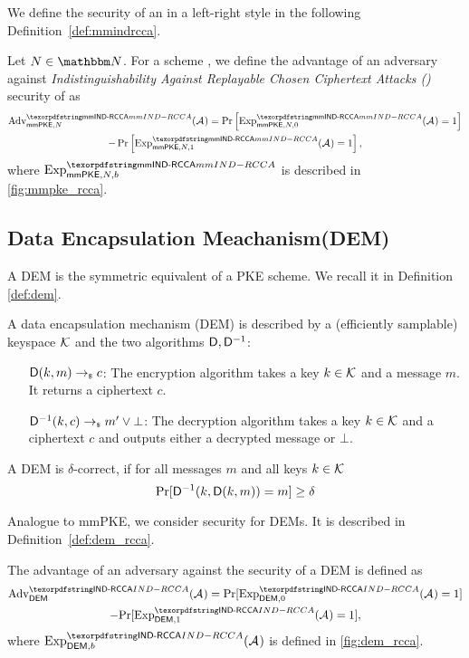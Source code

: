 We define the security of an \mmPKE in a left-right style in the following Definition~\ref{def:mmindrcca}.

\begin{definition}[\mmindrcca]\label{def:mmindrcca}
Let $N\in\N$. For a scheme \mmPKE, we define the advantage of an adversary \Adv against \emph{Indistinguishability Against Replayable Chosen Ciphertext Attacks (\mmindrcca)} security of \mmPKE as
\begin{multline*}
  \adv{\mmindrcca}{\mmPKE, \nUsers}(\Adv) = \Pr\left[\Exp^{\mmindrcca}_{\mmPKE,\nUsers, 0}(\Adv) = 1\right] \\ -
      \Pr\left[\Exp^{\mmindrcca}_{\mmPKE,\nUsers,1}(\Adv) = 1\right],
\end{multline*}
where $\textnormal{Exp}^{\mmindrcca}_{\mmPKE,N,b}$ is described in \cref{fig:mmpke_rcca}.
\end{definition}


\subsection{Data Encapsulation Meachanism(DEM)}
A DEM is the symmetric equivalent of a PKE scheme. We recall it in Definition \ref{def:dem}.

\begin{definition}[DEM]\label{def:dem}
  A data encapsulation mechanism (DEM) \dem is described by a (efficiently samplable) keyspace $\mathcal{K}$ and the two
  algorithms ${\mathsf{D}}, {\mathsf{D}}^{-1}$:
  \begin{itemize}[align=left]
    \item[${\mathsf{D}}(k, m)\rightarrow_{\scriptscriptstyle\$} c$:] The encryption algorithm takes a key $k\in\mathcal{K}$ and a message $m$. It returns a ciphertext $c$.
    \item[${\mathsf{D}}^{-1}(k, c) \rightarrow_{\scriptscriptstyle\$} m'\lor\bot$:] The decryption algorithm takes a key $k\in\mathcal{K}$ and a
      ciphertext $c$ and outputs either a decrypted message or $\bot$.
    \end{itemize}
    A DEM \dem is $\delta$-correct, if for all messages $m$ and all keys $k\in\mathcal{K}$
    \[
      \text{Pr}[{\mathsf{D}}^{-1}(k, {\mathsf{D}}(k,m)) = m] \geq \delta
    \]
  \end{definition}

  Analogue to mmPKE, we consider \indrcca security for DEMs. It is described in Definition~\ref{def:dem_rcca}.
  
  

  \begin{definition}\label{def:dem_rcca}
    The advantage of an adversary \Adv against the \indrcca security of a DEM \dem is defined as
    \begin{multline*}
      \adv{\indrcca}{\dem}(\Adv) = \text{Pr}[\experiment{\indrcca}{\dem, 0}(\Adv) = 1] \\-
      \text{Pr}[\experiment{\indrcca}{\dem, 1}(\Adv) = 1],
    \end{multline*}
    where $\experiment{\indrcca}{\dem, b}(\Adv)$ is defined in \cref{fig:dem_rcca}.
  \end{definition}

